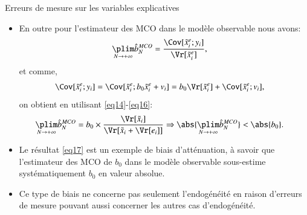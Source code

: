 \begin{frame}[allowframebreaks]{Erreurs de mesure sur les variables explicatives}
\begin{itemize}
\item En outre pour l'estimateur des MCO dans le modèle observable nous avons:
\begin{align}
\underset{N\to +\infty}{\plim} \hat{b}_N^{MCO} &= \frac{\Cov[\tilde{x}_i^e; y_i]}{\Vr[\tilde{x}_i^e]},
\label{eq15}
\end{align}
et comme,
\begin{align}
    \Cov[\tilde{x}_i^e; y_i]&=\Cov[\tilde{x}_i^e;b_0\tilde{x}_i^e + v_i]=
    b_0\Vr[\tilde{x}_i^e]+\Cov[\tilde{x}_i^e; v_i],
    \label{eq16}
\end{align}
on obtient en utilisant \eqref{eq14}-\eqref{eq16}:
\begin{align}
    \underset{N\to +\infty}{\plim} \hat{b}_N^{MCO} = b_0\times\frac{\Vr[\tilde{x}_i]}{\Vr[\tilde{x}_i + \Vr[e_i]]}
    &\Rightarrow \abs{ \underset{N\to +\infty}{\plim} \hat{b}_N^{MCO}} < \abs{b_0}.
    \label{eq17}
\end{align}
\item Le résultat \eqref{eq17} est un exemple de biais d’atténuation, à savoir que l'estimateur 
des MCO de $b_0$ dans le modèle observable sous-estime systématiquement $b_0$ en valeur absolue.
\item Ce type de biais ne concerne pas seulement l'endogénéité en raison d'erreurs de mesure
 pouvant aussi concerner les autres cas d'endogénéité.
\end{itemize}
\end{frame}
